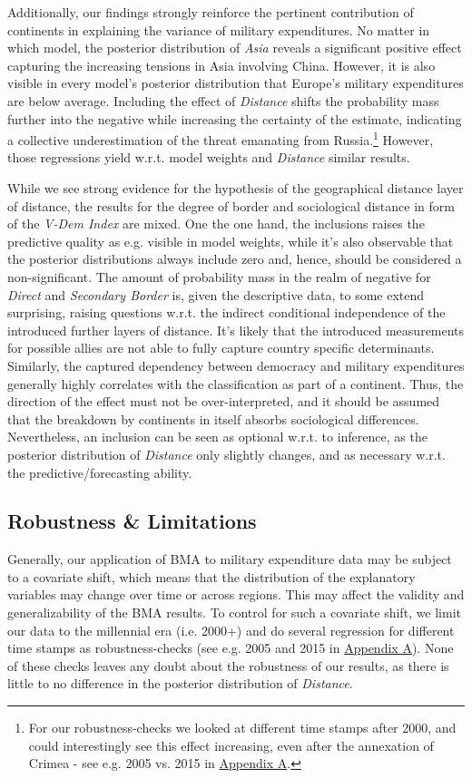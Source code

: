 \documentclass[12pt,a4paper]{article}
\begin{document}
Additionally, our findings strongly reinforce the pertinent contribution of continents in explaining the variance of military expenditures. No matter in which model, the posterior distribution of \textit{Asia} reveals a significant positive effect capturing the increasing tensions in Asia involving China. However, it is also visible in every model's posterior distribution that Europe's military expenditures are below average. Including the effect of \textit{Distance} shifts the probability mass further into the negative while increasing the certainty of the estimate, indicating a collective underestimation of the threat emanating from Russia.\footnote{For our robustness-checks we looked at different time stamps after 2000, and could interestingly see this effect increasing, even after the annexation of Crimea - see e.g. 2005 vs. 2015 in \hyperref[Appendix Tables]{\color{blue}Appendix A}.}
However, those regressions yield w.r.t. model weights and \textit{Distance} similar results.  

While we see strong evidence for the hypothesis of the geographical distance layer of distance, the results for the degree of border and sociological distance in form of the \textit{V-Dem Index} are mixed. One the one hand, the inclusions raises the predictive quality as e.g. visible in model weights, while it's also observable that the posterior distributions always include zero and, hence, should be considered a non-significant. The amount of probability mass in the realm of negative for \textit{Direct} and \textit{Secondary Border }is, given the descriptive data, to some extend surprising, raising questions w.r.t. the indirect conditional independence of the introduced further layers of distance. It's likely that the introduced measurements for possible allies are not able to fully capture country specific determinants. Similarly, the captured dependency between democracy and military expenditures generally highly correlates with the classification as part of a continent. Thus,  the direction of the effect must not be over-interpreted, and it should be assumed that the breakdown by continents in itself absorbs sociological differences. Nevertheless, an inclusion can be seen as optional w.r.t. to inference, as the posterior distribution of \textit{Distance} only slightly changes, and as necessary w.r.t. the predictive/forecasting ability. 
\subsection{Robustness \& Limitations}
Generally, our application of BMA to military expenditure data may be subject to a covariate shift, which means that the distribution of the explanatory variables may change over time or across regions. This may affect the validity and generalizability of the BMA results. To control for such a covariate shift, we limit our data to the millennial era (i.e. 2000+) and do several regression for different time stamps as robustness-checks (see e.g. 2005 and 2015 in \hyperref[Appendix Tables]{\color{blue}Appendix A}). None of these checks leaves any doubt about the robustness of our results, as there is little to no difference in the posterior distribution of \textit{Distance}. 
\end{document}
